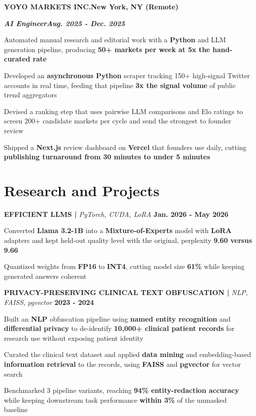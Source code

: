 \documentclass[10pt]{article}
\newcommand{\job}[4]{%
  \vspace{0pt}%
  \textbf{\MakeUppercase{#1}}\hfill\textbf{#2}\par
  \vspace{0.5pt}%
  \textbf{\textit{#3}}\hfill\textbf{\textit{#4}}\par
}
\newcommand{\proj}[4]{%
  \vspace{3pt}%
  \textbf{\MakeUppercase{#1} | }\textit{#2}\hfill
  \textbf{#4}%
  \notblank{#3}{\ \textbf{| #3}}{}%
  \par
}
\begin{document}
\vspace{3pt}
\job{Yoyo Markets Inc.}{New York, NY (Remote)}{AI Engineer}{Aug. 2025 - Dec. 2025}
\begin{bullets}
  \item Automated manual research and editorial work with a \textbf{Python} and LLM generation pipeline, producing \textbf{50+ markets per week at 5x the hand-curated rate}
  \item Developed an \textbf{asynchronous Python} scraper tracking 150+ high-signal Twitter accounts in real time, feeding that pipeline \textbf{3x the signal volume} of public trend aggregators
  \item Devised a ranking step that uses pairwise LLM comparisons and Elo ratings to screen 200+ candidate markets per cycle and send the strongest to founder review
  \item Shipped a \textbf{Next.js} review dashboard on \textbf{Vercel} that founders use daily, cutting \textbf{publishing turnaround from 30 minutes to under 5 minutes}
\end{bullets}

\section{Research and Projects}
\vspace{-3pt}
\proj{Efficient LLMs}{PyTorch, CUDA, LoRA}{USC}{Jan. 2026 - May 2026}
\begin{bullets}
  \item Converted \textbf{Llama 3.2-1B} into a \textbf{Mixture-of-Experts} model with \textbf{LoRA} adapters and kept held-out quality level with the original, perplexity \textbf{9.60 versus 9.66}
  \item Quantized weights from \textbf{FP16} to \textbf{INT4}, cutting model size \textbf{61\%} while keeping generated answers coherent
\end{bullets}

\proj{Privacy-Preserving Clinical Text Obfuscation}{NLP, FAISS, pgvector}{UMich SOCR Lab}{2023 - 2024}
\begin{bullets}
  \item Built an \textbf{NLP} obfuscation pipeline using \textbf{named entity recognition} and \textbf{differential privacy} to de-identify \textbf{10,000+ clinical patient records} for research use without exposing patient identity
  \item Curated the clinical text dataset and applied \textbf{data mining} and embedding-based \textbf{information retrieval} to the records, using \textbf{FAISS} and \textbf{pgvector} for vector search
  \item Benchmarked 3 pipeline variants, reaching \textbf{94\% entity-redaction accuracy} while keeping downstream task performance \textbf{within 3\%} of the unmasked baseline
\end{bullets}
\end{document}
